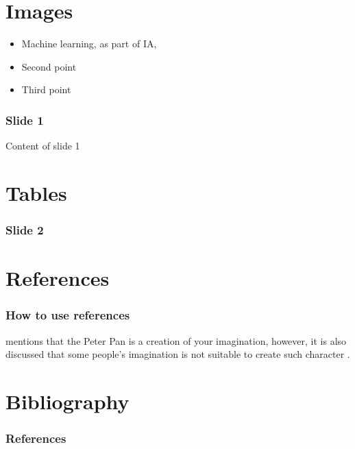 \documentclass[english,svgnames,notes=hide,12pt]{beamer}
\begin{document}
\section{Images}
\begin{frame}
\begin{itemize}[<+->]

    \item Machine learning, as part of IA,
    \item Second point
    \item Third point
\end{itemize}
	\frametitle{Slide 1}
	Content of slide 1
\end{frame}

\section{Tables}
\begin{frame}
	\frametitle{Slide 2}
\end{frame}

\section{References}
\begin{frame}
    \frametitle{How to use references}
     mentions that the Peter Pan is a creation of your imagination, however, it is also discussed that some people's imagination is not suitable to create such character .
\end{frame}

\section*{Bibliography}
\begin{frame}[allowframebreaks]
    \frametitle{References}
    \fontsize{5pt}{6.2}\selectfont
    
    \renewcommand{\bibliographytypesize}{\small}
    
\end{frame}
\end{document}
